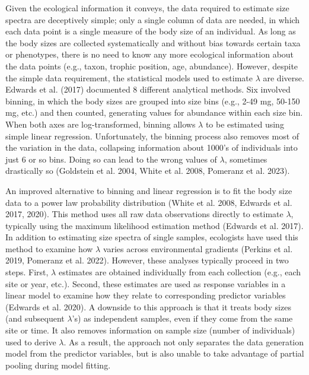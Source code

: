 \documentclass[
  12pt,
]{article}
\begin{document}
Given the ecological information it conveys, the data required to
estimate size spectra are deceptively simple; only a single column of
data are needed, in which each data point is a single measure of the
body size of an individual. As long as the body sizes are collected
systematically and without bias towards certain taxa or phenotypes,
there is no need to know any more ecological information about the data
points (e.g., taxon, trophic position, age, abundance). However, despite
the simple data requirement, the statistical models used to estimate
\(\lambda\) are diverse. Edwards et al. (2017) documented 8 different
analytical methods. Six involved binning, in which the body sizes are
grouped into size bins (e.g., 2-49 mg, 50-150 mg, etc.) and then
counted, generating values for abundance within each size bin. When both
axes are log-transformed, binning allows \(\lambda\) to be estimated
using simple linear regression. Unfortunately, the binning process also
removes most of the variation in the data, collapsing information about
1000's of individuals into just 6 or so bins. Doing so can lead to the
wrong values of \(\lambda\), sometimes drastically so (Goldstein et al.
2004, White et al. 2008, Pomeranz et al. 2023).

An improved alternative to binning and linear regression is to fit the
body size data to a power law probability distribution (White et al.
2008, Edwards et al. 2017, 2020). This method uses all raw data
observations directly to estimate \(\lambda\), typically using the
maximum likelihood estimation method (Edwards et al. 2017). In addition
to estimating size spectra of single samples, ecologists have used this
method to examine how \(\lambda\) varies across environmental gradients
(Perkins et al. 2019, Pomeranz et al. 2022). However, these analyses
typically proceed in two steps. First, \(\lambda\) estimates are
obtained individually from each collection (e.g., each site or year,
etc.). Second, these estimates are used as response variables in a
linear model to examine how they relate to corresponding predictor
variables (Edwards et al. 2020). A downside to this approach is that it
treats body sizes (and subsequent \(\lambda\)'s) as independent samples,
even if they come from the same site or time. It also removes
information on sample size (number of individuals) used to derive
\(\lambda\). As a result, the approach not only separates the data
generation model from the predictor variables, but is also unable to
take advantage of partial pooling during model fitting.
\end{document}
